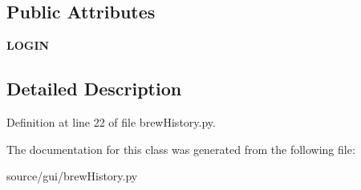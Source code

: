 \subsection*{Public Attributes}
\begin{DoxyCompactItemize}
\item 
\mbox{\label{classbrew_history_1_1_brew_history_a695bfc1c411f0fbae15d8dd213ec074b}} 
{\bfseries L\+O\+G\+IN}
\end{DoxyCompactItemize}


\subsection{Detailed Description}


Definition at line 22 of file brew\+History.\+py.



The documentation for this class was generated from the following file\+:\begin{DoxyCompactItemize}
\item 
source/gui/brew\+History.\+py\end{DoxyCompactItemize}
